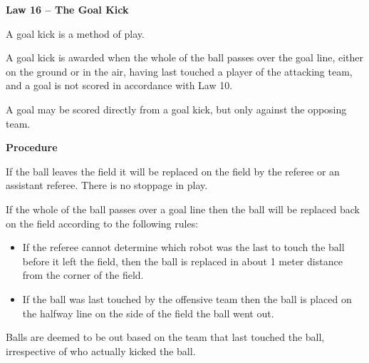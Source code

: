\clearpage
\sffamily
{\bfseries
\textcolor[rgb]{0.4,0.4,0.4}{Law 16 -- The Goal Kick} }
{}


\bigskip

A goal kick is a method of   play.

\bigskip

A goal kick is awarded when the whole of the ball passes over the goal
line, either on the ground or in the air, having last touched a player
of the attacking team, and a goal is not scored in accordance with Law
10.

\bigskip

A goal may be scored directly from a goal kick, but only against the
opposing team.

\bigskip

{\bfseries Procedure}

\headlinebox

If the ball leaves the field it will be replaced on the field by the
referee or an assistant referee. There is no stoppage in play.

If the whole of the ball passes over a goal line then the ball will be
replaced back on the field according to the following rules: 


\begin{itemize}
\item If the referee cannot determine which robot was the last to touch
the ball before it left the field, then the ball is replaced in about 1
meter distance from the corner of the field. 
\item If the ball was last touched by the offensive team then the ball
is placed on the halfway line on the side of the field the ball went
out. 
\end{itemize}

Balls are deemed to be out based on the team that last touched the ball,
irrespective of who actually kicked the ball. 


